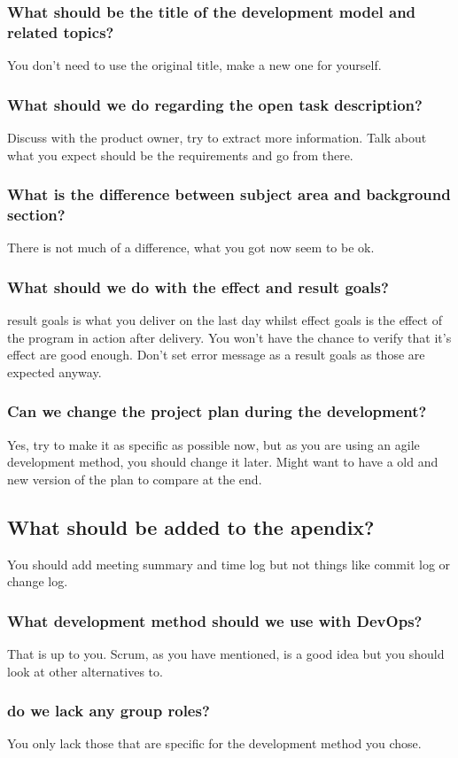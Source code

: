 \subsubsection*{What should be the title of the development model and related topics?}
You don't need to use the original title, make a new one for yourself.

\subsubsection*{What should we do regarding the open task description? }
Discuss with the product owner, try to extract more information. Talk about what you expect should be the requirements and go from there.

\subsubsection*{What is the difference between subject area and background section?}
There is not much of a difference, what you got now seem to be ok.

\subsubsection*{What should we do with the effect and result goals?}
result goals is what you deliver on the last day whilst effect goals is the effect of the program in action after delivery. You won't have the chance to verify that it's effect are good enough. Don't set error message as a result goals as those are expected anyway.

\subsubsection*{Can we change the project plan during the development?}
Yes, try to make it as specific as possible now, but as you are using an agile development method, you should change it later. Might want to have a old and new version of the plan to compare at the end.

\subsection*{What should be added to the apendix?}
You should add meeting summary and time log but not things like commit log or change log.

\subsubsection*{What development method should we use with DevOps?}
That is up to you. Scrum, as you have mentioned, is a good idea but you should look at other alternatives to.

\subsubsection*{do we lack any group roles?}
You only lack those that are specific for the development method you chose. 

\newpage